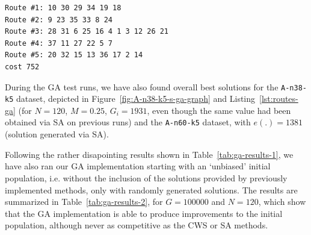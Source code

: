 \begin{lstlisting}[label=lst:routes-ga,caption={Routes and solution 
value obtained after running the proposed GA implementation, against the 
dataset A-n38-k5.}]
Route #1: 10 30 29 34 19 18
Route #2: 9 23 35 33 8 24
Route #3: 28 31 6 25 16 4 1 3 12 26 21
Route #4: 37 11 27 22 5 7
Route #5: 20 32 15 13 36 17 2 14
cost 752

\end{lstlisting}

During the GA test 
runs, we have also found overall 
best solutions for the \verb?A-n38-k5? dataset, depicted in Figure~\ref{fig:A-n38-k5-s-ga-graph} and 
Listing~\ref{lst:routes-ga} (for $N = 120$, $M = 0.25$, $G_i = 1931$, even though the same 
value had been obtained via SA on previous runs) and the \verb?A-n60-k5? 
dataset, with $e(.) = 1381$ (solution generated via SA).\vertbreak

Following the rather disapointing results shown in Table~\ref{tab:ga-results-1}, 
we have also ran our GA implementation starting with an `unbiased' initial 
population, i.e. without the inclusion of the solutions provided by previously 
implemented methods, only with randomly generated solutions. The results are 
summarized in Table~\ref{tab:ga-results-2}, for $G = 100000$ and $N = 120$, 
which show that the GA implementation is able to produce improvements to the 
initial population, although never as competitive as the CWS or SA methods.\vertbreak

